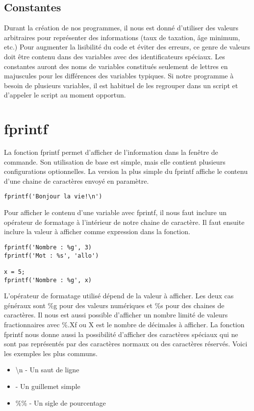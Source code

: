 \documentclass{tufte-handout}
\begin{document}
\subsection{Constantes}
Durant la création de nos programmes, il nous est donné d'utiliser des valeurs arbitraires pour représenter des informations (taux de taxation, âge minimum, etc.) Pour augmenter la lisibilité du code et éviter des erreurs, ce genre de valeurs doit être contenu dans des variables avec des identificateurs spéciaux. Les constantes auront des noms de variables constitués seulement de lettres en majuscules pour les différences des variables typiques.
Si notre programme à besoin de plusieurs variables, il est habituel de les regrouper dans un script et d'appeler le script au moment opportun.

\section{fprintf}
La fonction fprintf permet d'afficher de l'information dans la fenêtre de commande. Son utilisation de base est simple, mais elle contient plusieurs configurations optionnelles.
La version la plus simple du fprintf affiche le contenu d'une chaine de caractères envoyé en paramètre.
\begin{lstlisting}[title={Simple fprintf}]
fprintf('Bonjour la vie!\n')
\end{lstlisting}
Pour afficher le contenu d'une variable avec fprintf, il nous faut inclure un opérateur de formatage à l'intérieur de notre chaine de caractère. Il faut ensuite inclure la valeur à afficher comme expression dans la fonction.
\begin{lstlisting}[title={fprintf avec opérateur de formatage}]
fprintf('Nombre : %g', 3)
fprintf('Mot : %s', 'allo')

x = 5;
fprintf('Nombre : %g', x)
\end{lstlisting}
L'opérateur de formatage utilisé dépend de la valeur à afficher. Les deux cas généraux sont \%g pour des valeurs numériques et \%s pour des chaines de caractères. Il nous est aussi possible d'afficher un nombre limité de valeurs fractionnaires avec \%.Xf ou X est le nombre de décimales à afficher.
La fonction fprintf nous donne aussi la possibilité d'afficher des caractères spéciaux qui ne sont pas représentés par des caractères normaux ou des caractères réservés. Voici les exemples les plus communs.
\begin{itemize}
    \item \textbackslash{}n - Un saut de ligne
    \item \textquotesingle\textquotesingle - Un guillemet simple
    \item \%\% - Un sigle de pourcentage
\end{itemize}
\end{document}
